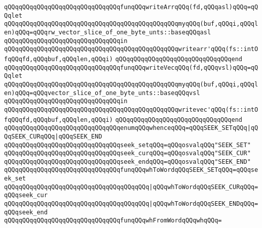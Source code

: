 \newline
\verb|qQQqqQQqqQQqqQQqqQQqqQQqqQQqqQQqfunqQQqwriteArrqQQq(fd,qQQqasl)qQQq=qQQqlet|\newline
\verb|qQQqqQQqqQQqqQQqqQQqqQQqqQQqqQQqqQQqqQQqqQQqqQQqmyqQQq(buf,qQQqi,qQQqlen)qQQq=qQQqrw_vector_slice_of_one_byte_unts::baseqQQqasl|\newline
\verb|qQQqqQQqqQQqqQQqqQQqqQQqqQQqqQQqin|\newline
\verb|qQQqqQQqqQQqqQQqqQQqqQQqqQQqqQQqqQQqqQQqqQQqqQQqwritearr'qQQq(fs::intOfqQQqfd,qQQqbuf,qQQqlen,qQQqi)|\newline
\verb|qQQqqQQqqQQqqQQqqQQqqQQqqQQqqQQqend|\newline
\newline
\verb|qQQqqQQqqQQqqQQqqQQqqQQqqQQqqQQqfunqQQqwriteVecqQQq(fd,qQQqvsl)qQQq=qQQqlet|\newline
\verb|qQQqqQQqqQQqqQQqqQQqqQQqqQQqqQQqqQQqqQQqqQQqqQQqmyqQQq(buf,qQQqi,qQQqlen)qQQq=qQQqvector_slice_of_one_byte_unts::baseqQQqvsl|\newline
\verb|qQQqqQQqqQQqqQQqqQQqqQQqqQQqqQQqin|\newline
\verb|qQQqqQQqqQQqqQQqqQQqqQQqqQQqqQQqqQQqqQQqqQQqqQQqwritevec'qQQq(fs::intOfqQQqfd,qQQqbuf,qQQqlen,qQQqi)|\newline
\verb|qQQqqQQqqQQqqQQqqQQqqQQqqQQqqQQqend|\newline
\newline
\verb|qQQqqQQqqQQqqQQqqQQqqQQqqQQqqQQqenumqQQqwhenceqQQq=qQQqSEEK_SETqQQq|\verb#|qQQqSEEK_CURqQQq|qQQqSEEK_END#\newline
\verb|qQQqqQQqqQQqqQQqqQQqqQQqqQQqqQQqseek_setqQQq=qQQqosvalqQQq"SEEK_SET"|\newline
\verb|qQQqqQQqqQQqqQQqqQQqqQQqqQQqqQQqseek_curqQQq=qQQqosvalqQQq"SEEK_CUR"|\newline
\verb|qQQqqQQqqQQqqQQqqQQqqQQqqQQqqQQqseek_endqQQq=qQQqosvalqQQq"SEEK_END"|\newline
\newline
\verb|qQQqqQQqqQQqqQQqqQQqqQQqqQQqqQQqfunqQQqwhToWordqQQqSEEK_SETqQQq=qQQqseek_set|\newline
\verb|qQQqqQQqqQQqqQQqqQQqqQQqqQQqqQQqqQQqqQQq|\verb#|qQQqwhToWordqQQqSEEK_CURqQQq=qQQqseek_cur#\newline
\verb|qQQqqQQqqQQqqQQqqQQqqQQqqQQqqQQqqQQqqQQq|\verb#|qQQqwhToWordqQQqSEEK_ENDqQQq=qQQqseek_end#\newline
\newline
\verb|qQQqqQQqqQQqqQQqqQQqqQQqqQQqqQQqfunqQQqwhFromWordqQQqwhqQQq=|\newline
